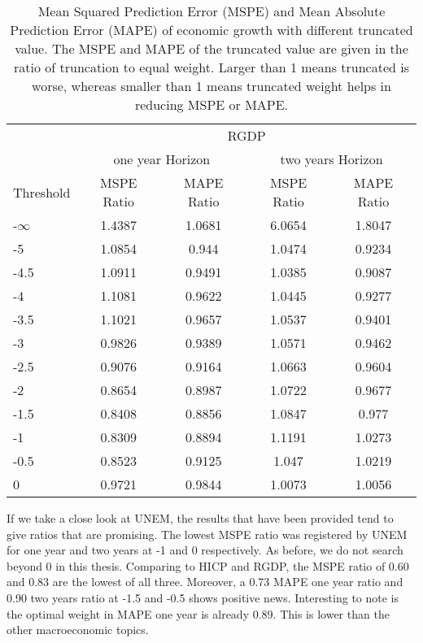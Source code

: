 \documentclass[11pt]{article}
\begin{document}
\begin{table}[!h]
	\centering
	\caption{Mean Squared Prediction Error (MSPE) and Mean Absolute Prediction Error (MAPE) of economic growth with different truncated value. The MSPE and MAPE of the truncated value are given in the ratio of truncation to equal weight. Larger than 1 means truncated is worse, whereas smaller than 1 means truncated weight helps in reducing MSPE or MAPE.}
	\label{tab: c MSPE RGDP}
	\begin{tabular}{lcccc}
		\hline\hline
		&                        \multicolumn{4}{c}{RGDP}                         \\
		\cmidrule(lr){2-5}                              & \multicolumn{2}{c}{one year Horizon} & \multicolumn{2}{c}{two years Horizon} \\
		\cmidrule(lr){2-3} \cmidrule(lr){4-5}
		Threshold & MSPE Ratio &    MAPE Ratio    & MSPE Ratio &    MAPE Ratio    \\ \hline
-$\infty$ & 1.4387 & 1.0681 & 6.0654 & 1.8047\\ 
-5 & 1.0854 & 0.944 & 1.0474 & 0.9234\\ 
-4.5 & 1.0911 & 0.9491 & 1.0385 & 0.9087\\ 
-4 & 1.1081 & 0.9622 & 1.0445 & 0.9277\\ 
-3.5 & 1.1021 & 0.9657 & 1.0537 & 0.9401\\ 
-3 & 0.9826 & 0.9389 & 1.0571 & 0.9462\\ 
-2.5 & 0.9076 & 0.9164 & 1.0663 & 0.9604\\ 
-2 & 0.8654 & 0.8987 & 1.0722 & 0.9677\\ 
-1.5 & 0.8408 & 0.8856 & 1.0847 & 0.977\\ 
-1 & 0.8309 & 0.8894 & 1.1191 & 1.0273\\ 
-0.5 & 0.8523 & 0.9125 & 1.047 & 1.0219\\ 
0 & 0.9721 & 0.9844 & 1.0073 & 1.0056\\ 
		\hline\hline
	\end{tabular}
\end{table}

If we take a close look at UNEM, the results that have been provided tend to give ratios that are promising. The lowest MSPE ratio was registered by UNEM for one year and two years at -1 and 0 respectively. As before, we do not search beyond 0 in this thesis. Comparing to HICP and RGDP, the MSPE ratio of 0.60 and 0.83 are the lowest of all three.  Moreover, a 0.73 MAPE one year ratio and 0.90 two years ratio at -1.5 and -0.5 shows positive news. Interesting to note is the optimal weight in MAPE one year is already 0.89. This is lower than the other macroeconomic topics.
\end{document}
